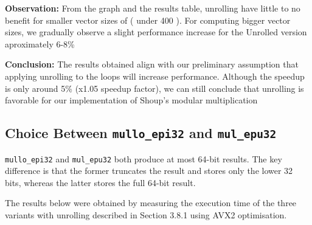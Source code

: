 \documentclass{article}
\newcommand{\pointlabel}[1]{\par\smallskip\noindent\textbf{\textcolor{accentorange}{#1:}} }
\begin{document}
\pointlabel{Observation}
From the graph and the results table, unrolling have little to no benefit for smaller vector sizes of ( under 400 ). For computing bigger vector sizes, we gradually observe a slight performance increase for the Unrolled version aproximately 6-8\%

\pointlabel{Conclusion}The results obtained align with our preliminary assumption that applying unrolling to the loops will increase performance. Although the speedup is only around 5\% (x1.05 speedup factor), we can still conclude that unrolling is favorable for our implementation of Shoup's modular multiplication


\subsection{Choice Between \texttt{mullo\_epi32} and \texttt{mul\_epu32}}
\texttt{mullo\_epi32} and \texttt{mul\_epu32} both produce at most 64-bit results. The key difference is that the former truncates the result and stores only the lower 32 bits, whereas the latter stores the full 64-bit result.

The results below were obtained by measuring the execution time of the three variants with unrolling described in Section 3.8.1 using AVX2 optimisation.
\end{document}
